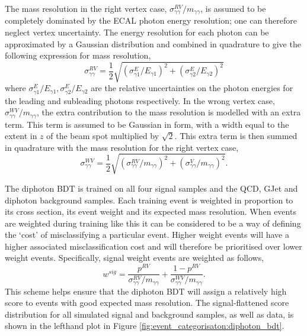 The mass resolution in the right vertex case, $\sigma^{RV}_{\gamma\gamma}/m_{\gamma\gamma}$, is assumed to be completely dominated by the ECAL photon energy resolution; one can therefore neglect vertex uncertainty. The energy resolution for each photon can be approximated by a Gaussian distribution and combined in quadrature to give the following expression for mass resolution,
\begin{equation}
    \sigma^{RV}_{\gamma\gamma} = \frac{1}{2}\sqrt{(\sigma^{E}_{\gamma{1}}/E_{\gamma{1}})^2 + (\sigma^{E}_{\gamma{2}}/E_{\gamma{2}})^2}
\end{equation} 
where $\sigma^{E}_{\gamma{1}}/E_{\gamma{1}}, \sigma^{E}_{\gamma{2}}/E_{\gamma{2}}$ are the relative uncertainties on the photon energies for the leading and subleading photons respectively. 
In the wrong vertex case, $\sigma^{WV}_{\gamma\gamma}/m_{\gamma\gamma}$, the extra contribution to the mass resolution is modelled with an extra term. This term is assumed to be Gaussian in form, with a width equal to the extent in $z$ of the beam spot multiplied by $\sqrt{2}$. This extra term is then summed in quadrature with the mass resolution for the right vertex case,
\begin{equation}
    \sigma^{WV}_{\gamma\gamma} = \frac{1}{2}\sqrt{(\sigma^{RV}_{\gamma\gamma}/m_{\gamma\gamma})^2 + (\sigma^{V}_{\gamma\gamma}/m_{\gamma\gamma})^2}.
\end{equation} 


The diphoton BDT is trained on all four signal samples and the QCD, GJet and diphoton background samples. 
Each training event is weighted in proportion to its cross section, its event weight and its expected mass resolution. 
When events are weighted during training like this it can be considered to be a way of defining the `cost' of misclassifying a particular event. Higher weight events will have a higher associated misclassification cost and will therefore be prioritised over lower weight events. 
Specifically, signal weight events are weighted as follows,
\begin{equation}
    w^{sig} = \frac{p^{RV}}{\sigma^{RV}_{\gamma\gamma}/m_{\gamma\gamma}} + \frac{1-p^{RV}}{\sigma^{WV}_{\gamma\gamma}/m_{\gamma\gamma}}.
\end{equation}
This scheme helps ensure that the diphoton BDT will assign a relatively high score to events with good expected mass resolution. 
The signal-flattened score distribution for all simulated signal and background samples, as well as data, is shown in the lefthand plot in Figure \ref{fig:event_categorisaton:diphoton_bdt}. 


